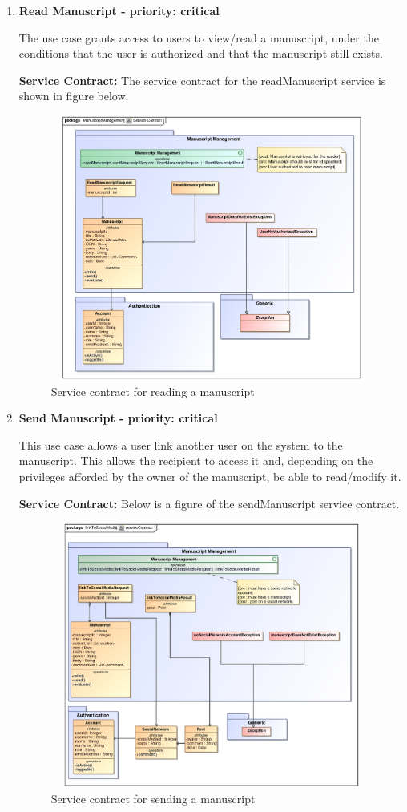 \documentclass[12pt]{article}
\begin{document}
\begin{enumerate}
\newpage
\item \textbf{Read Manuscript - priority: critical}
\par{The use case grants access to users to view/read a manuscript, under the conditions that the user is authorized and that the manuscript still exists.}

\par{\textbf{Service Contract:} The service contract for the readManuscript service is shown in figure below.}

\begin{figure}[h]
\includegraphics[height=330px, width=500px]{epsImages/ManuscriptManagement/ReadManuscript.eps}
\caption{Service contract for reading a manuscript}
\end{figure}

\newpage
\item \textbf{Send Manuscript - priority: critical}
\par {This use case allows a user link another user on the system to the manuscript. This allows the recipient to access it and, depending on the privileges afforded by the owner of the manuscript, be able to read/modify it.}

\textbf{Service Contract:} Below is a figure of the sendManuscript service contract.

\begin{figure}[h]
\includegraphics[height=330px, width=500px]{epsImages/ManuscriptManagement/sendManuscriptServiceContract.eps}
\caption{Service contract for sending a manuscript}
\end{figure}
 
\end{enumerate}
\end{document}
